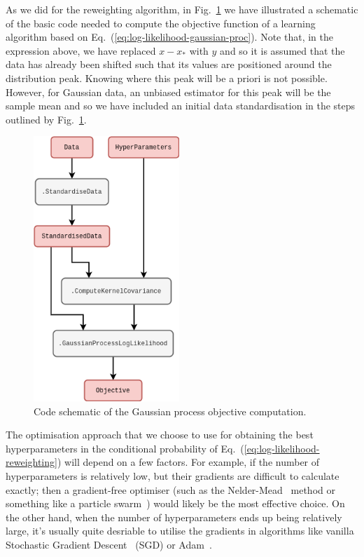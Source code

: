 As we did for the reweighting algorithm, in Fig.~\ref{fig:gaussian-process-code} we have illustrated a schematic of the basic code needed to compute the objective function of a learning algorithm based on Eq.~(\ref{eq:log-likelihood-gaussian-proc}). Note that, in the expression above, we have replaced $x-x_*$ with $y$ and so it is assumed that the data has already been shifted such that its values are positioned around the distribution peak. Knowing where this peak will be a priori is not possible. However, for Gaussian data, an unbiased estimator for this peak will be the sample mean and so we have included an initial data standardisation in the steps outlined by Fig.~\ref{fig:gaussian-process-code}.

\begin{figure}[h]
\centering
\includegraphics[width=5.5cm]{images/chapter-2-gaussian-process-code.drawio.png}
\caption{Code schematic of the Gaussian process objective computation.}
\label{fig:gaussian-process-code}
\end{figure}

The optimisation approach that we choose to use for obtaining the best hyperparameters in the conditional probability of Eq.~(\ref{eq:log-likelihood-reweighting}) will depend on a few factors. For example, if the number of hyperparameters is relatively low, but their gradients are difficult to calculate exactly; then a gradient-free optimiser (such as the Nelder-Mead~\cite{nelder1965simplex} method or something like a particle swarm~\cite{kennedy1995particle, shi1998modified}) would likely be the most effective choice. On the other hand, when the number of hyperparameters ends up being relatively large, it's usually quite desriable to utilise the gradients in algorithms like vanilla Stochastic Gradient Descent~\cite{robbins1951stochastic} (SGD) or Adam~\cite{kingma2014adam}.

